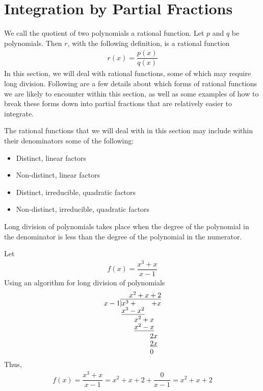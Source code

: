 \newpage
\section{Integration by Partial Fractions}

\begin{recall}
We call the quotient of two polynomials a rational function. Let $p$ and $q$ be polynomials. Then $r$, with the following definition, is a rational function
\begin{align*}
    r(x) = \dfrac{p(x)}{q(x)}
\end{align*}
In this section, we will deal with rational functions, some of which may require long division. Following are a few details about which forms of rational functions we are likely to encounter within this section, as well as some examples of how to break these forms down into partial fractions that are relatively easier to integrate.
\end{recall}

\begin{note}
The rational functions that we will deal with in this section may include within their denominators some of the following:
\begin{itemize}
    \item Distinct, linear factors
    \item Non-distinct, linear factors
    \item Distinct, irreducible, quadratic factors
    \item Non-distinct, irreducible, quadratic factors
\end{itemize}
\label{four_cases_for_partial_fractions}
\end{note}

\begin{recall}
Long division of polynomials takes place when the degree of the polynomial in the denominator is less than the degree of the polynomial in the numerator.
\end{recall}

\begin{example}
Let
\begin{align*}
    f(x) = \dfrac{x^{3} + x}{x - 1}
\end{align*}
Using an algorithm for long division of polynomials
\begin{align*}
\setstackgap{S}{1.5pt}
\stackMath\def\stackalignment{r}
\stackunder{
  x-1 \stackon[1pt]{\showdiv{x^{3} + \hspace{20pt} + x}}{x^{2} + x + 2}
}{
  \Shortstack[l]{{\underline{x^{3}-x^{2}}\ph{\hspace{10pt} + x}} \ph{x^{3}-}x^{2}+x {\ph{x^{3}-}\underline{x^{2}-x}} \ph{x^{3}-x^{2}-}2x {\ph{x^{3}-x^{2}-}\underline{2x}} 
   \ph{x^{3}-x^{2}-}0}
  }
\end{align*}
Thus,
\begin{align*}
    f(x) = \dfrac{x^{3} + x}{x - 1} = x^{2} + x + 2 + \dfrac{0}{x - 1} = x^{2} + x + 2
\end{align*}
\end{example}


